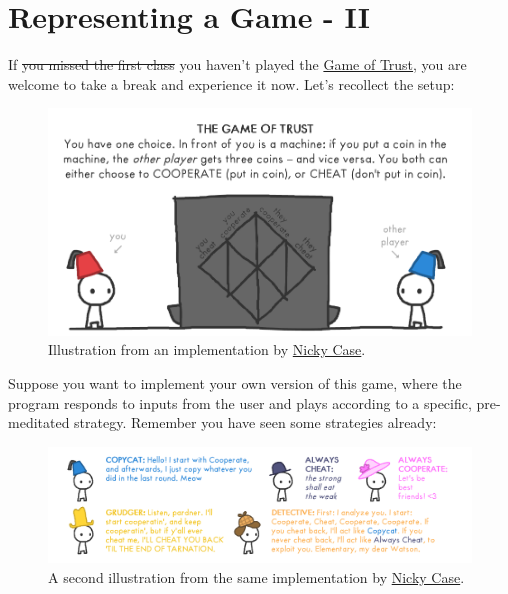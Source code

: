\documentclass[
  letterpaper,
  DIV=11,
  numbers=noendperiod]{scrreprt}
\begin{document}
\hypertarget{representing-a-game---ii}{%
\section{Representing a Game - II}\label{representing-a-game---ii}}

If \sout{you missed the first class} you haven't played the
\href{https://ncase.me/trust/}{Game of Trust}, you are welcome to take a
break and experience it now. Let's recollect the setup:

\begin{figure}

{\centering \includegraphics{./figures/ch1-game-trust.png}

}

\caption{Illustration from an implementation by
\href{https://ncase.me/trust/}{Nicky Case}.}

\end{figure}

Suppose you want to implement your own version of this game, where the
program responds to inputs from the user and plays according to a
specific, pre-meditated strategy. Remember you have seen some strategies
already:

\begin{figure}

{\centering \includegraphics{./figures/ch1-players-trust.png}

}

\caption{A second illustration from the same implementation by
\href{https://ncase.me/trust/}{Nicky Case}.}

\end{figure}
\end{document}
